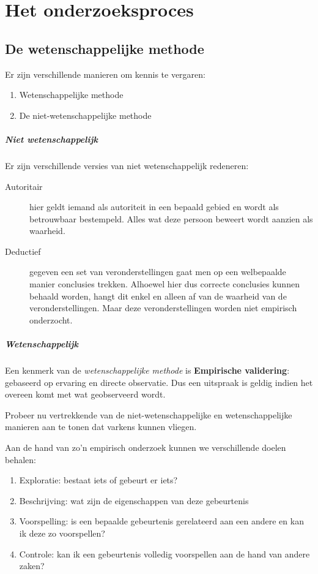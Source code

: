 \chapter{Het onderzoeksproces}
\section{De wetenschappelijke methode}
Er zijn verschillende manieren om kennis te vergaren:

\begin{enumerate}
	\item Wetenschappelijke methode
	\item De niet-wetenschappelijke methode
\end{enumerate}

\paragraph{Niet wetenschappelijk}Er zijn verschillende versies van niet wetenschappelijk redeneren: 
\begin{description}
	\item [Autoritair] hier geldt iemand als autoriteit in een bepaald gebied en wordt als betrouwbaar bestempeld. Alles wat deze persoon beweert wordt aanzien als waarheid. 
	\item [Deductief] gegeven een set van veronderstellingen gaat men op een welbepaalde manier conclusies trekken. Alhoewel hier dus correcte conclusies kunnen behaald worden, hangt dit enkel en alleen af van de waarheid van de veronderstellingen. Maar deze veronderstellingen worden niet empirisch onderzocht.
\end{description}

\paragraph{Wetenschappelijk}
Een kenmerk van de \textsl{wetenschappelijke methode} is \textbf{Empirische validering}: gebaseerd op ervaring en directe observatie. Dus een uitspraak is geldig indien het overeen komt met wat geobserveerd wordt.


\begin{exercise}
Probeer nu vertrekkende van de niet-wetenschappelijke en wetenschappelijke manieren aan te tonen dat varkens kunnen vliegen. 
\end{exercise}


Aan de hand van zo'n empirisch onderzoek kunnen we verschillende doelen behalen:
\begin{enumerate}
	\item Exploratie: bestaat iets of gebeurt er iets?
	\item Beschrijving: wat zijn de eigenschappen van deze gebeurtenis
	\item Voorspelling: is een bepaalde gebeurtenis gerelateerd aan een andere en kan ik deze zo voorspellen?
	\item Controle: kan ik een gebeurtenis volledig voorspellen aan de hand van andere zaken?
\end{enumerate}

